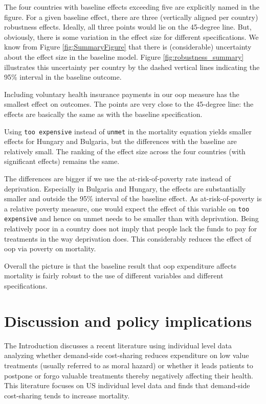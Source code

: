 \documentclass[a4paper,12pt]{article}
\begin{document}
The four countries with baseline effects exceeding five are explicitly named in the figure. For a given baseline effect, there are three (vertically aligned per country) robustness effects. Ideally, all three points would lie on the 45-degree line. But, obviously, there is some variation in the effect size for different specifications. We know from Figure \ref{fig:SummaryFigure} that there is (considerable) uncertainty about the effect size in the baseline model. Figure \ref{fig:robustness_summary} illustrates this uncertainty per country by the dashed vertical lines indicating the 95\% interval in the baseline outcome.

Including voluntary health insurance payments in our oop measure has the smallest effect on outcomes. The points are very close to the 45-degree line: the effects are basically the same as with the baseline specification.

Using \texttt{too expensive} instead of \texttt{unmet} in the mortality equation yields smaller effects for Hungary and Bulgaria, but the differences with the baseline are relatively small. The ranking of the effect size across the four countries (with significant effects) remains the same.

The differences are bigger if we use the at-risk-of-poverty rate instead of deprivation. Especially in Bulgaria and Hungary, the effects are substantially smaller and outside the 95\% interval of the baseline effect. As at-risk-of-poverty is a relative poverty measure, one would expect the effect of this variable on \texttt{too expensive} and hence on unmet needs to be smaller than with deprivation. Being relatively poor in a country does not imply that people lack the funds to pay for treatments in the way deprivation does. This considerably reduces the effect of oop via poverty on mortality.

Overall the picture is that the baseline result that oop expenditure affects mortality is fairly robust to the use of different variables and different specifications. 


\section{Discussion and policy implications}
\label{sec:org9c25272}

The Introduction discusses a recent literature using individual level data analyzing whether demand-side cost-sharing reduces expenditure on low value treatments (usually referred to as moral hazard) or whether it leads patients to postpone or forgo valuable treatments thereby negatively affecting their health. This literature focuses on US individual level data and finds that demand-side cost-sharing tends to increase mortality.
\end{document}
